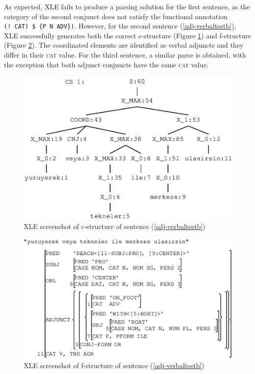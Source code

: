 As expected, XLE fails to produce a parsing solution for the first sentence, as the category of the second conjunct does not satisfy the functional annotation \mbox{\texttt{(!\ CAT) \$ \{P N ADV\})}}. However, for the second sentence (\ref{adj-verbaltestb}), XLE successfully generates both the correct c-structure (Figure \ref{fig:cstr-vadj}) and f-structure (Figure \ref{fig:fstrverbadj}). The coordinated elements are identified as verbal adjuncts and they differ in their \textsc{cat} value. For the third sentence, a similar parse is obtained, with the exception that both adjunct conjuncts have the same \textsc{cat} value.


\vspace{10pt}


\begin{figure}[H]
	\centering
	\includegraphics[width=0.72\linewidth]{images/implementation/cstr:verbadj}
	\caption{XLE screenshot of c-structure of sentence (\ref{adj-verbaltestb})}
	\label{fig:cstr-vadj}
\end{figure}

\begin{figure}[H]
	\centering
	\includegraphics[width=0.7\linewidth]{images/implementation/fstr:verbadj}
	\caption{XLE screenshot of f-structure of sentence (\ref{adj-verbaltestb})}
	\label{fig:fstrverbadj}
\end{figure}

